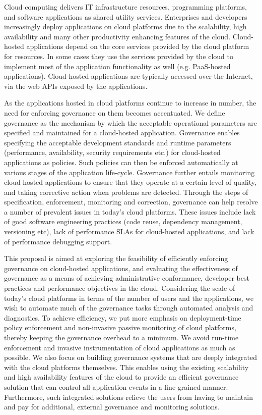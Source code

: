 Cloud computing delivers IT infrastructure resources, programming platforms, and software
applications as shared utility services. Enterprises and developers increasingly deploy applications 
on cloud platforms due to the scalability, high availability and many other
productivity enhancing features of the cloud. Cloud-hosted applications 
depend on the core services provided
by the cloud platform for resources. In some cases they use the services provided by the cloud to implement most of
the application functionality as well (e.g. PaaS-hosted applications). 
Cloud-hosted applications are typically
accessed over the Internet, via the web APIs exposed by the applications.

As the applications hosted in cloud platforms continue to increase in number, the need for enforcing
governance on them becomes accentuated. We define governance as the mechanism by which the 
acceptable operational parameters are specified and maintained for a cloud-hosted application.
Governance enables specifying the acceptable
development standards and runtime parameters (performance, availability, security requirements etc.) 
for cloud-hosted applications as policies. Such
policies can then be enforced automatically at various stages of the application life-cycle. 
Governance further entails
monitoring cloud-hosted applications to ensure that they operate at a certain level of quality,
and taking corrective action when problems are detected. Through the steps of specification,
enforcement, monitoring and correction, governance can help resolve a number of prevalent issues in
today's cloud platforms. These issues include lack of good software engineering practices (code reuse,
dependency management, versioning etc), lack of performance SLAs for cloud-hosted applications,
and lack of performance debugging support. 

This proposal is aimed at exploring the feasibility of efficiently enforcing governance on cloud-hosted
applications, and evaluating the effectiveness of governance as a means of achieving administrative
conformance, developer best practices and performance objectives in the cloud. Considering the scale of
today's cloud platforms in terms of the number of users and the applications, 
we wish to automate much of the governance tasks through
automated analysis and diagnostics. To achieve efficiency, we put more emphasis on deployment-time
policy enforcement and non-invasive passive monitoring of cloud platforms, thereby keeping the 
governance overhead
to a minimum. We avoid run-time enforcement and invasive instrumentation of cloud applications 
as much as possible. We also focus on building governance systems that are deeply integrated with
the cloud platforms themselves. This enables using the existing scalability and high availability features of the cloud
to provide an efficient governance solution that can control all application events in a fine-grained
manner. Furthermore, such integrated solutions relieve the users from having to maintain and pay
for additional, external governance and monitoring solutions.


